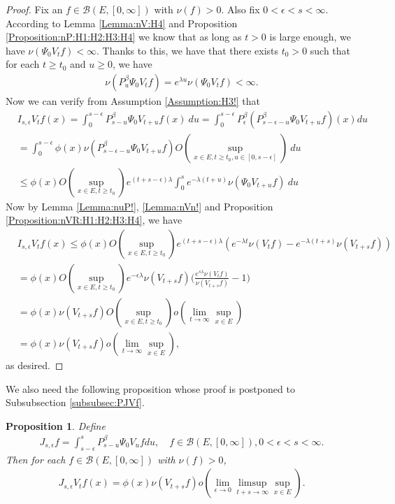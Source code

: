\documentclass[12pt,a4paper]{amsart}
\numberwithin{equation}{section}
\theoremstyle{plain}
\newtheorem{prop}[thm]{Proposition}
\theoremstyle{definition}
\theoremstyle{remark}
\begin{document}
\begin{proof}
Fix an $f\in \mathcal B(E,[0,\infty])$ with $\nu(f)>0$. 
Also fix $0<\epsilon < s< \infty$. 
According to Lemma \ref{Lemma:nV:H4} and Proposition \ref{Proposition:nP:H1:H2:H3:H4} we know that as long as $t>0$ is large enough, we have $\nu(\Psi_0 V_t f)< \infty$.
Thanks to this, we have that there exists $t_0>0$ such that for each $t\geq t_0$ and $u\geq 0$, we have
\begin{align}
\nu(P_u^\beta \Psi_0 V_t f) 
= e^{\lambda u}\nu(\Psi_0 V_t f)
< \infty.
\end{align} 
Now we can verify from Assumption \ref{Assumption:H3!} that
\begin{align}
 &I_{s,\epsilon} V_t f(x) 
 = \int_0^{s- \epsilon} P_{s-u}^\beta \Psi_0 V_{t+u} f (x)~du 
 = \int_0^{s- \epsilon} P_\epsilon^\beta (P_{s - \epsilon - u}^\beta \Psi_0 V_{t+u} f )(x) du 
 \\&= \int_0^{s - \epsilon} \phi(x) \nu(P_{s - \epsilon - u}^{\beta} \Psi_0 V_{t+u} f) O(\sup_{x\in E, t\geq t_0, u\in [0,s-\epsilon]}) ~du 
 \\&\leq \phi(x) O(\sup_{x\in E, t\geq t_0}) e^{(t+s-\epsilon)\lambda} \int_0^{s} e^{-\lambda (t+u)} \nu(\Psi_0 V_{t+u}f)~du
 \end{align}
Now by Lemma \ref{Lemma:nuP!}, \ref{Lemma:nVn!} and Proposition \ref{Proposition:nVR:H1:H2:H3:H4}, we have
\begin{align}
  &I_{s,\epsilon} V_t f(x) 
 \leq \phi(x) O(\sup_{x\in E, t\geq t_0}) e^{(t+s-\epsilon)\lambda} (e^{-\lambda t}\nu(V_tf)- e^{-\lambda(t+s)}\nu(V_{t+s}f)) 
 \\&= \phi(x) O(\sup_{x\in E, t\geq t_0})e^{-\epsilon \lambda} \nu(V_{t+s}f) \Big( \frac{e^{s \lambda }\nu(V_tf)}{\nu(V_{t+s}f)} - 1\Big)
 \\&= \phi(x) \nu(V_{t+s}f) O(\sup_{x\in E, t\geq t_0}) o(\lim_{t\to \infty}\sup_{x\in E})
 \\&= \phi(x)\nu(V_{t+s}f)o(\lim_{t\to \infty} \sup_{x\in E}),
 \end{align}
as desired.
\end{proof}
We also need the following proposition whose proof is postponed to Subsubsection \ref{subsubsec:PJVf}.
\begin{prop} \label{Proposition:JVf:H1:H2:H3:H4} 
Define 
\begin{align}
 J_{s,\epsilon} f 
 = \int_{s-\epsilon}^s P_{s-u}^\beta \Psi_0 V_u f du,
 \quad f\in \mathcal B(E,[0,\infty]), 0< \epsilon < s< \infty.
 \end{align}
Then for each $f\in \mathcal B(E,[0,\infty])$ with $\nu(f)>0$,
\begin{align}
 J_{s,\epsilon} V_tf(x) 
 = \phi(x) \nu(V_{t+s}f) o(\lim_{\epsilon \to 0}\limsup_{t+s\to \infty} \sup_{x\in E}).
 \end{align}
\end{prop}
\end{document}
